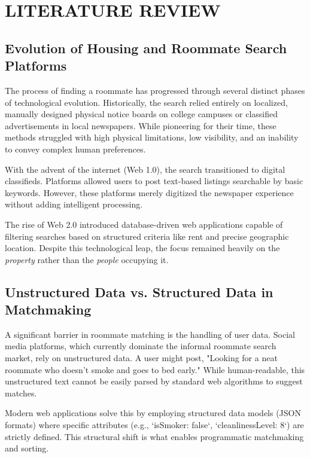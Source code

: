 \documentclass[12pt,a4paper]{report}
\begin{document}
\chapter{LITERATURE REVIEW}

\section{Evolution of Housing and Roommate Search Platforms}
The process of finding a roommate has progressed through several distinct phases of technological evolution. Historically, the search relied entirely on localized, manually designed physical notice boards on college campuses or classified advertisements in local newspapers. While pioneering for their time, these methods struggled with high physical limitations, low visibility, and an inability to convey complex human preferences.

With the advent of the internet (Web 1.0), the search transitioned to digital classifieds. Platforms allowed users to post text-based listings searchable by basic keywords. However, these platforms merely digitized the newspaper experience without adding intelligent processing.

The rise of Web 2.0 introduced database-driven web applications capable of filtering searches based on structured criteria like rent and precise geographic location. Despite this technological leap, the focus remained heavily on the \textit{property} rather than the \textit{people} occupying it.

\section{Unstructured Data vs. Structured Data in Matchmaking}
A significant barrier in roommate matching is the handling of user data. Social media platforms, which currently dominate the informal roommate search market, rely on unstructured data. A user might post, "Looking for a neat roommate who doesn't smoke and goes to bed early." While human-readable, this unstructured text cannot be easily parsed by standard web algorithms to suggest matches.

Modern web applications solve this by employing structured data models (JSON formats) where specific attributes (e.g., `isSmoker: false`, `cleanlinessLevel: 8`) are strictly defined. This structural shift is what enables programmatic matchmaking and sorting.
\end{document}

